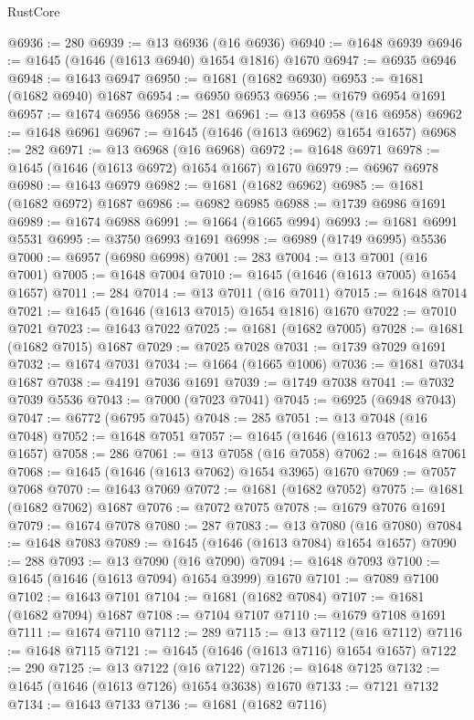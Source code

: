 \begin{lexlean}{RustCore}
\begin{coremodule}
@6936 := 280
@6939 := @13 @6936 (@16 @6936)
@6940 := @1648 @6939
@6946 := @1645 (@1646 (@1613 @6940) @1654 @1816) @1670
@6947 := @6935 @6946
@6948 := @1643 @6947
@6950 := @1681 (@1682 @6930)
@6953 := @1681 (@1682 @6940) @1687
@6954 := @6950 @6953
@6956 := @1679 @6954 @1691
@6957 := @1674 @6956
@6958 := 281
@6961 := @13 @6958 (@16 @6958)
@6962 := @1648 @6961
@6967 := @1645 (@1646 (@1613 @6962) @1654 @1657)
@6968 := 282
@6971 := @13 @6968 (@16 @6968)
@6972 := @1648 @6971
@6978 := @1645 (@1646 (@1613 @6972) @1654 @1667) @1670
@6979 := @6967 @6978
@6980 := @1643 @6979
@6982 := @1681 (@1682 @6962)
@6985 := @1681 (@1682 @6972) @1687
@6986 := @6982 @6985
@6988 := @1739 @6986 @1691
@6989 := @1674 @6988
@6991 := @1664 (@1665 @994)
@6993 := @1681 @6991 @5531
@6995 := @3750 @6993 @1691
@6998 := @6989 (@1749 @6995) @5536
@7000 := @6957 (@6980 @6998)
@7001 := 283
@7004 := @13 @7001 (@16 @7001)
@7005 := @1648 @7004
@7010 := @1645 (@1646 (@1613 @7005) @1654 @1657)
@7011 := 284
@7014 := @13 @7011 (@16 @7011)
@7015 := @1648 @7014
@7021 := @1645 (@1646 (@1613 @7015) @1654 @1816) @1670
@7022 := @7010 @7021
@7023 := @1643 @7022
@7025 := @1681 (@1682 @7005)
@7028 := @1681 (@1682 @7015) @1687
@7029 := @7025 @7028
@7031 := @1739 @7029 @1691
@7032 := @1674 @7031
@7034 := @1664 (@1665 @1006)
@7036 := @1681 @7034 @1687
@7038 := @4191 @7036 @1691
@7039 := @1749 @7038
@7041 := @7032 @7039 @5536
@7043 := @7000 (@7023 @7041)
@7045 := @6925 (@6948 @7043)
@7047 := @6772 (@6795 @7045)
@7048 := 285
@7051 := @13 @7048 (@16 @7048)
@7052 := @1648 @7051
@7057 := @1645 (@1646 (@1613 @7052) @1654 @1657)
@7058 := 286
@7061 := @13 @7058 (@16 @7058)
@7062 := @1648 @7061
@7068 := @1645 (@1646 (@1613 @7062) @1654 @3965) @1670
@7069 := @7057 @7068
@7070 := @1643 @7069
@7072 := @1681 (@1682 @7052)
@7075 := @1681 (@1682 @7062) @1687
@7076 := @7072 @7075
@7078 := @1679 @7076 @1691
@7079 := @1674 @7078
@7080 := 287
@7083 := @13 @7080 (@16 @7080)
@7084 := @1648 @7083
@7089 := @1645 (@1646 (@1613 @7084) @1654 @1657)
@7090 := 288
@7093 := @13 @7090 (@16 @7090)
@7094 := @1648 @7093
@7100 := @1645 (@1646 (@1613 @7094) @1654 @3999) @1670
@7101 := @7089 @7100
@7102 := @1643 @7101
@7104 := @1681 (@1682 @7084)
@7107 := @1681 (@1682 @7094) @1687
@7108 := @7104 @7107
@7110 := @1679 @7108 @1691
@7111 := @1674 @7110
@7112 := 289
@7115 := @13 @7112 (@16 @7112)
@7116 := @1648 @7115
@7121 := @1645 (@1646 (@1613 @7116) @1654 @1657)
@7122 := 290
@7125 := @13 @7122 (@16 @7122)
@7126 := @1648 @7125
@7132 := @1645 (@1646 (@1613 @7126) @1654 @3638) @1670
@7133 := @7121 @7132
@7134 := @1643 @7133
@7136 := @1681 (@1682 @7116)

\end{coremodule}
\end{lexlean}
